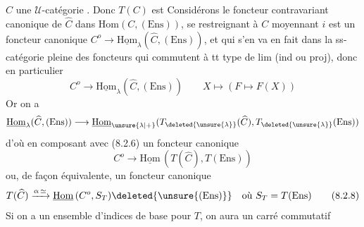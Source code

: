   $\widehat C$     une $\mathcal U$-catégorie  . Donc $T(C)$ est
 Considérons le foncteur
contravariant canonique de $\widehat C$ dans $\mathrm{Hom}(C,(\mathrm{Ens}))$, se
restreignant à $C$  moyennant $i$ est un foncteur
canonique $C^o\longrightarrow\underline{\mathrm{Hom}}_\lambda(\widehat C,(\mathrm{Ens}))$, et qui s'en va en
fait dans la  ss-catégorie pleine des foncteurs
qui commutent à tt type  de lim (ind ou proj),
donc en particulier
\[
 C^o\longrightarrow\underline{\mathrm{Hom}}_\lambda(\widehat C,(\mathrm{Ens}))\qquad X\longmapsto(F\longmapsto F(X))\tag*{(8.2.6)}
\]
Or on a
\[
\underline{\mathrm{Hom}}_\lambda(\widehat C,(\mathrm{Ens}))\longrightarrow
\underline{\mathrm{Hom}}_{\unsure{\lambda|+}}(T_{\deleted{\unsure{\lambda}}}(\widehat C),T_{\deleted{\unsure{\lambda}}}(\mathrm{Ens}))
\]
d'où  en composant avec (8.2.6) un foncteur canonique
\[
 C^o\longrightarrow\underline{\mathrm{Hom}}\,(T(\widehat C),T(\mathrm{Ens}))\tag*{(8.2.7)}
\]
ou, de façon équivalente, un foncteur canonique
\[
 T(\widehat C)\xrightarrow{\alpha\,\simeq}\underline{\mathrm{Hom}}\,(C^o,S_T)\deleted{\unsure{(\mathrm{Ens})}}\quad\text{où }S_T=T(\mathrm{Ens})\tag*{(8.2.8)}
\]
Si on a un ensemble d'indices de base pour $T$, on aura un
carré commutatif

